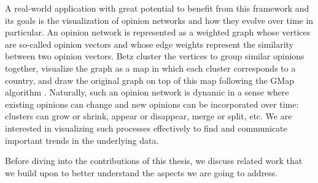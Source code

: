 A real-world application with great potential to benefit from this framework and its goals is the visualization of opinion networks \cite{betz2019applying} and how they evolve over time in particular.
An opinion network is represented as a weighted graph whose vertices are so-called opinion vectors and whose edge weights represent the similarity between two opinion vectors.
Betz \etal{} \cite{betz2019applying} cluster the vertices to group similar opinions together, visualize the graph as a map in which each cluster corresponds to a country, and draw the original graph on top of this map following the GMap algorithm \cite{gansner2009gmap}.
Naturally, such an opinion network is dynamic in a sense where existing opinions can change and new opinions can be incorporated over time: clusters can grow or shrink, appear or disappear, merge or split, etc.
We are interested in visualizing such processes effectively to find and communicate important trends in the underlying data.

Before diving into the contributions of this thesis, we discuss related work that we build upon to better understand the aspects we are going to address.
